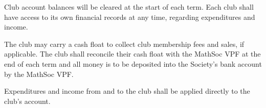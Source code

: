Club account balances will be cleared at the start of each term. Each club shall have access to its own financial records at any time, regarding expenditures and income. 

The club may carry a cash float to collect club membership fees and sales, if applicable. 
The club shall reconcile their cash float with the MathSoc VPF at the end of each term and all money is to be deposited into the Society's bank account by the MathSoc VPF. 

Expenditures and income from and to the club shall be applied directly to the club's account. 
